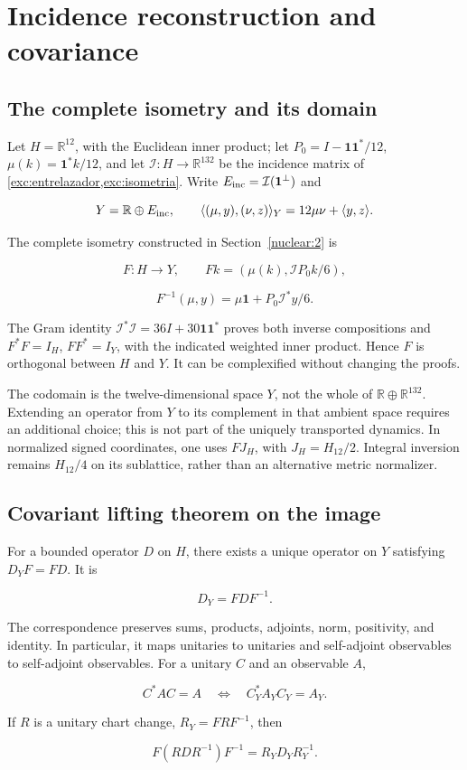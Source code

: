 \section{Incidence reconstruction and covariance}
\label{nuclear:5}
\subsection{The complete isometry and its domain}\label{nuc05:isometria}

Let \(H=\mathbb R^{12}\), with the Euclidean inner product; let \(P_0=I-\mathbf1\mathbf1^*/12\), \(\mu(k)=\mathbf1^*k/12\), and let \(\mathcal I:H\to\mathbb R^{132}\) be the incidence matrix of \cref{exc:entrelazador,exc:isometria}. Write \(E_{\rm inc}=\mathcal I(\mathbf1^\perp)\) and

\[
Y=\mathbb R\oplus E_{\rm inc},\qquad
\langle(\mu,y),(\nu,z)\rangle_Y=12\mu\nu+\langle y,z\rangle.
\]

The complete isometry constructed in Section~\ref{nuclear:2} is

\[
F:H\longrightarrow Y,\qquad Fk=(\mu(k),\mathcal I P_0k/6),
\]

\[
F^{-1}(\mu,y)=\mu\mathbf1+P_0\mathcal I^*y/6.
\]

The Gram identity \(\mathcal I^*\mathcal I=36I+30\mathbf1\mathbf1^*\) proves both inverse compositions and \(F^*F=I_H\), \(FF^*=I_Y\), with the indicated weighted inner product. Hence \(F\) is orthogonal between \(H\) and \(Y\). It can be complexified without changing the proofs.

The codomain is the twelve-dimensional space \(Y\), not the whole of \(\mathbb R\oplus\mathbb R^{132}\). Extending an operator from \(Y\) to its complement in that ambient space requires an additional choice; this is not part of the uniquely transported dynamics. In normalized signed coordinates, one uses \(FJ_H\), with \(J_H=H_{12}/2\). Integral inversion remains \(H_{12}/4\) on its sublattice, rather than an alternative metric normalizer.

\subsection{Covariant lifting theorem on the image}\label{nuc05:levantamiento}

\begin{theorem}
For a bounded operator \(D\) on \(H\), there exists a unique operator on \(Y\) satisfying \(D_YF=FD\). It is

\[
D_Y=FDF^{-1}.
\]

The correspondence preserves sums, products, adjoints, norm, positivity, and identity. In particular, it maps unitaries to unitaries and self-adjoint observables to self-adjoint observables. For a unitary \(C\) and an observable \(A\),

\[
C^*AC=A\quad\Longleftrightarrow\quad C_Y^*A_YC_Y=A_Y.
\]

If \(R\) is a unitary chart change, \(R_Y=FRF^{-1}\), then

\[
F(RDR^{-1})F^{-1}=R_YD_YR_Y^{-1}.
\]
\end{theorem}

